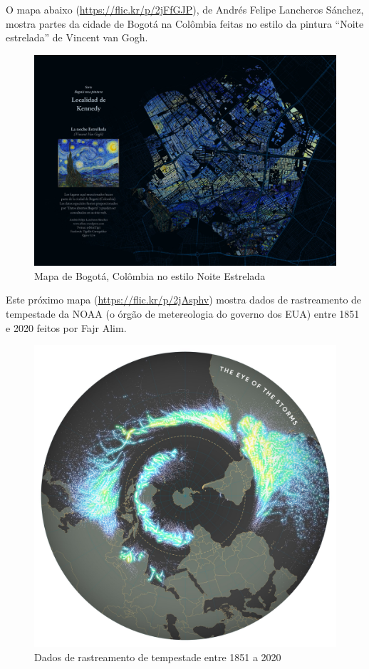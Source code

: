 \documentclass[
]{krantz}
\begin{document}
O mapa abaixo (\url{https://flic.kr/p/2jFfGJP}), de Andrés Felipe Lancheros Sánchez, mostra partes da cidade de Bogotá na Colômbia feitas no estilo da pintura ``Noite estrelada'' de Vincent van Gogh.

\begin{figure}
\centering
\includegraphics{media/modulo1/sample-1.jpg}
\caption{Mapa de Bogotá, Colômbia no estilo Noite Estrelada}
\end{figure}

Este próximo mapa (\url{https://flic.kr/p/2jAsphv}) mostra dados de rastreamento de tempestade da NOAA (o órgão de metereologia do governo dos EUA) entre 1851 e 2020 feitos por Fajr Alim.

\begin{figure}
\centering
\includegraphics{media/modulo1/sample-2.jpg}
\caption{Dados de rastreamento de tempestade entre 1851 a 2020}
\end{figure}
\end{document}
